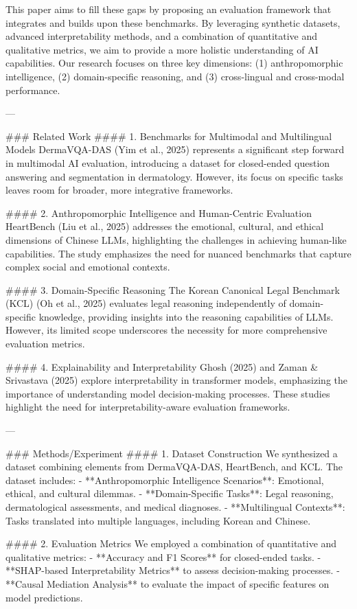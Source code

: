 This paper aims to fill these gaps by proposing an evaluation framework that integrates and builds upon these benchmarks. By leveraging synthetic datasets, advanced interpretability methods, and a combination of quantitative and qualitative metrics, we aim to provide a more holistic understanding of AI capabilities. Our research focuses on three key dimensions: (1) anthropomorphic intelligence, (2) domain-specific reasoning, and (3) cross-lingual and cross-modal performance.

---

### Related Work
#### 1. Benchmarks for Multimodal and Multilingual Models
DermaVQA-DAS (Yim et al., 2025) represents a significant step forward in multimodal AI evaluation, introducing a dataset for closed-ended question answering and segmentation in dermatology. However, its focus on specific tasks leaves room for broader, more integrative frameworks.

#### 2. Anthropomorphic Intelligence and Human-Centric Evaluation
HeartBench (Liu et al., 2025) addresses the emotional, cultural, and ethical dimensions of Chinese LLMs, highlighting the challenges in achieving human-like capabilities. The study emphasizes the need for nuanced benchmarks that capture complex social and emotional contexts.

#### 3. Domain-Specific Reasoning
The Korean Canonical Legal Benchmark (KCL) (Oh et al., 2025) evaluates legal reasoning independently of domain-specific knowledge, providing insights into the reasoning capabilities of LLMs. However, its limited scope underscores the necessity for more comprehensive evaluation metrics.

#### 4. Explainability and Interpretability
Ghosh (2025) and Zaman & Srivastava (2025) explore interpretability in transformer models, emphasizing the importance of understanding model decision-making processes. These studies highlight the need for interpretability-aware evaluation frameworks.

---

### Methods/Experiment
#### 1. Dataset Construction
We synthesized a dataset combining elements from DermaVQA-DAS, HeartBench, and KCL. The dataset includes:
- **Anthropomorphic Intelligence Scenarios**: Emotional, ethical, and cultural dilemmas.
- **Domain-Specific Tasks**: Legal reasoning, dermatological assessments, and medical diagnoses.
- **Multilingual Contexts**: Tasks translated into multiple languages, including Korean and Chinese.

#### 2. Evaluation Metrics
We employed a combination of quantitative and qualitative metrics:
- **Accuracy and F1 Scores** for closed-ended tasks.
- **SHAP-based Interpretability Metrics** to assess decision-making processes.
- **Causal Mediation Analysis** to evaluate the impact of specific features on model predictions.

